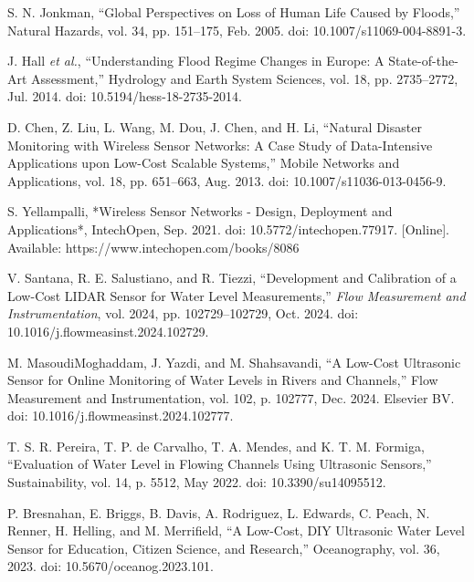 \documentclass[conference]{IEEEtran}
\begin{document}
\begin{thebibliography}{00}

 S. N. Jonkman, 
``Global Perspectives on Loss of Human Life Caused by Floods,'' 
Natural Hazards, vol. 34, pp. 151--175, Feb. 2005. doi: 10.1007/s11069-004-8891-3.

 J. Hall \textit{et al.}, 
``Understanding Flood Regime Changes in Europe: A State-of-the-Art Assessment,'' 
Hydrology and Earth System Sciences, vol. 18, pp. 2735--2772, Jul. 2014. doi: 10.5194/hess-18-2735-2014.

 D. Chen, Z. Liu, L. Wang, M. Dou, J. Chen, and H. Li, 
``Natural Disaster Monitoring with Wireless Sensor Networks: A Case Study of Data-Intensive Applications upon Low-Cost Scalable Systems,'' 
Mobile Networks and Applications, vol. 18, pp. 651--663, Aug. 2013. doi: 10.1007/s11036-013-0456-9.

 S. Yellampalli, 
*Wireless Sensor Networks - Design, Deployment and Applications*, IntechOpen, Sep. 2021. doi: 10.5772/intechopen.77917. [Online]. Available: https://www.intechopen.com/books/8086

 V. Santana, R. E. Salustiano, and R. Tiezzi, ``Development and Calibration of a Low-Cost LIDAR Sensor for Water Level Measurements,'' \emph{Flow Measurement and Instrumentation}, vol. 2024, pp. 102729--102729, Oct. 2024. doi: 10.1016/j.flowmeasinst.2024.102729.

 M. MasoudiMoghaddam, J. Yazdi, and M. Shahsavandi, 
``A Low-Cost Ultrasonic Sensor for Online Monitoring of Water Levels in Rivers and Channels,'' 
Flow Measurement and Instrumentation, vol. 102, p. 102777, Dec. 2024. Elsevier BV. doi: 10.1016/j.flowmeasinst.2024.102777.

 T. S. R. Pereira, T. P. de Carvalho, T. A. Mendes, and K. T. M. Formiga, 
``Evaluation of Water Level in Flowing Channels Using Ultrasonic Sensors,'' 
Sustainability, vol. 14, p. 5512, May 2022. doi: 10.3390/su14095512.

 P. Bresnahan, E. Briggs, B. Davis, A. Rodriguez, L. Edwards, C. Peach, N. Renner, H. Helling, and M. Merrifield, 
``A Low-Cost, DIY Ultrasonic Water Level Sensor for Education, Citizen Science, and Research,'' 
Oceanography, vol. 36, 2023. doi: 10.5670/oceanog.2023.101.



\end{thebibliography}
\end{document}
